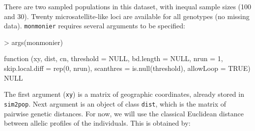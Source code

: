 \documentclass{article}
\begin{document}
There are two sampled populations in this dataset, with inequal sample sizes (100 and 30).
Twenty microsatellite-like loci are available for all genotypes (no missing data).
\texttt{monmonier} requires several arguments to be specified:
\begin{Schunk}
\begin{Sinput}
> args(monmonier)
\end{Sinput}
\begin{Soutput}
function (xy, dist, cn, threshold = NULL, bd.length = NULL, nrun = 1, 
    skip.local.diff = rep(0, nrun), scanthres = is.null(threshold), 
    allowLoop = TRUE) 
NULL
\end{Soutput}
\end{Schunk}

\noindent The first argument (\texttt{xy}) is a matrix of geographic coordinates, already stored in \texttt{sim2pop}.
Next argument is an object of class \texttt{dist}, which is the matrix of pairwise genetic distances.
For now, we will use the classical Euclidean distance between allelic profiles of the individuals.
This is obtained by:
\begin{Schunk}
\end{Schunk}
\end{document}
